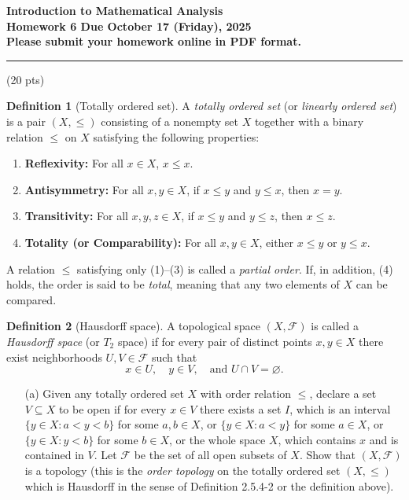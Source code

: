 \documentclass[addpoints]{exam}
\theoremstyle{definition}
\newtheorem*{definition}{Definition}
\begin{document}
\begin{CJK*}{UTF8}{gbsn}
\begin{center}
    {\Large{\bf Introduction to Mathematical Analysis\\
    Homework 6  Due  October 17  (Friday), 2025\\
    Please submit your homework online in PDF format.
  }} \\ 
    \large
\end{center}

\noindent\rule{16.2cm}{0.4pt}


\begin{questions}


\question  (20 pts)  

  \begin{definition}[Totally ordered set]\label{def:total-order}
A \emph{totally ordered set} (or \emph{linearly ordered set}) is a pair $(X, \leq)$ consisting of a nonempty set $X$ together with a binary relation $\leq$ on $X$ satisfying the following properties:
\begin{enumerate}
    \item \textbf{Reflexivity:} For all $x \in X$, $x \leq x$.
    \item \textbf{Antisymmetry:} For all $x, y \in X$, if $x \leq y$ and $y \leq x$, then $x = y$.
    \item \textbf{Transitivity:} For all $x, y, z \in X$, if $x \leq y$ and $y \leq z$, then $x \leq z$.
    \item \textbf{Totality (or Comparability):} For all $x, y \in X$, either $x \leq y$ or $y \leq x$.
\end{enumerate}
A relation $\leq$ satisfying only (1)--(3) is called a \emph{partial order}.  
If, in addition, (4) holds, the order is said to be \emph{total}, meaning that any two elements of $X$ can be compared.
\end{definition}


\begin{definition}[Hausdorff space]
A topological space $(X,\mathcal{F})$ is called a \emph{Hausdorff space} (or $T_2$ space) if for every pair of distinct points $x,y \in X$ there exist neighborhoods 
$U,V \in \mathcal{F}$ such that
\[
x \in U, \quad y \in V, \quad \text{and } U \cap V = \varnothing.
\]
\end{definition}
  \begin{enumerate}
  \item[(a)] Given any totally ordered set $X$ with order relation $\le$, declare a set $V \subseteq X$ to be open if for every $x \in V$ there exists a set $I$, which is an interval  
$\{y \in X : a < y < b\}$ for some $a, b \in X$, or  
$\{y \in X : a < y\}$ for some $a \in X$, or  
$\{y \in X : y < b\}$ for some $b \in X$, or the whole space $X$, which contains $x$ and is contained in $V$.  
Let $\mathcal{F}$ be the set of all open subsets of $X$.  
Show that $(X, \mathcal{F})$ is a topology (this is the \emph{order topology} on the totally ordered set $(X, \le)$ which is Hausdorff in the sense of  Definition 2.5.4-2 or the definition above).  



\end{enumerate}
\end{questions}
\end{CJK*}
\end{document}
